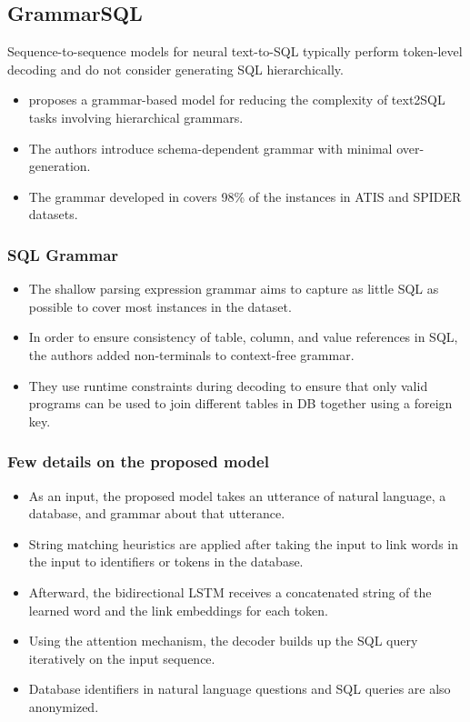 \subsection*{GrammarSQL}

Sequence-to-sequence models for neural text-to-SQL typically perform token-level decoding and do not consider generating SQL hierarchically.

\begin{itemize}
    \item \cite{xu_sqlnet_2017} proposes a grammar-based model for reducing the complexity of text2SQL tasks involving hierarchical grammars.
    \item The authors introduce schema-dependent grammar with minimal over-generation.
    \item The grammar developed in \cite{xu_sqlnet_2017} covers 98\% of the instances in ATIS and SPIDER datasets.
\end{itemize}

\subsubsection*{SQL Grammar}

\begin{itemize}
    \item The shallow parsing expression grammar aims to capture as little SQL as possible to cover most instances in the dataset.
    \item In order to ensure consistency of table, column, and value references in SQL, the authors added non-terminals to context-free grammar.
    \item They use runtime constraints during decoding to ensure that only valid programs can be used to join different tables in DB together using a foreign key.
\end{itemize}

\subsubsection*{Few details on the proposed model}

\begin{itemize}
    \item As an input, the proposed model takes an utterance of natural language, a database, and grammar about that utterance.
    \item String matching heuristics are applied after taking the input to link words in the input to identifiers or tokens in the database.
    \item Afterward, the bidirectional LSTM receives a concatenated string of the learned word and the link embeddings for each token.
    \item Using the attention mechanism, the decoder builds up the SQL query iteratively on the input sequence.
    \item Database identifiers in natural language questions and SQL queries are also anonymized.
\end{itemize}


